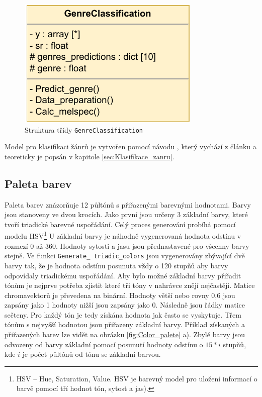 \begin{figure}[H]
    \centering
    \includegraphics[width = 0.3\linewidth]{obrazky/UML_diagramy_GenreClassification.pdf}
    \caption{Struktura třídy \texttt{GenreClassification}}
    \label{fig:GenreClassification_diagram}
\end{figure}

Model pro klasifikaci žánrů je vytvořen pomocí návodu  \cite{Music_classification_using_deep_learning}, který vychází z článku \cite{Music_genre_classification_paper} a teoreticky je popsán v kapitole \ref{sec:Klasifikace_zanru}. 


\subsection{Paleta barev} \label{sec:Color_palete}

Paleta barev znázorňuje 12 půltónů s přiřazenými barevnými hodnotami. Barvy jsou stanoveny ve dvou krocích. Jako první jsou určeny 3 základní barvy, které tvoří triadické barevné uspořádání. Celý proces generování probíhá pomocí modelu \acs{HSV}\footnote{HSV -- Hue, Saturation, Value. HSV je barevný model pro uložení informací o barvě pomocí tří hodnot tón, sytost a jas).} U základní barvy je náhodně vygenerovaná hodnota odstínu v rozmezí 0 až 360. Hodnoty sytosti a jasu jsou přednastavené pro všechny barvy stejně. Ve funkci \texttt{Generate\_ triadic\_colors} jsou vygenerovány zbývající dvě barvy tak, že je hodnota odstínu posunuta vždy o 120 stupňů aby barvy odpovídaly triadickému uspořádání. Aby bylo možné základní barvy přiřadit tónům je nejprve potřeba zjistit které tři tóny v nahrávce znějí nejčastěji. Matice chromavektorů je převedena na binární. Hodnoty větší nebo rovny 0,6 jsou zapsány jako 1 hodnoty nižší jsou zapsány jako 0. Následně jsou řádky matice sečteny. Pro každý tón je tedy získána hodnota jak často se vyskytuje. Třem tónům s nejvyšší hodnotou jsou přiřazeny základní barvy. Příklad získaných a přiřazených barev lze vidět na obrázku \ref{fig:Color_palete} a). Zbylé barvy jsou odvozeny od barvy základní pomocí posunutí hodnoty odstínu o $15*i$ stupňů, kde $i$ je počet půltónů od tónu se základní barvou.

